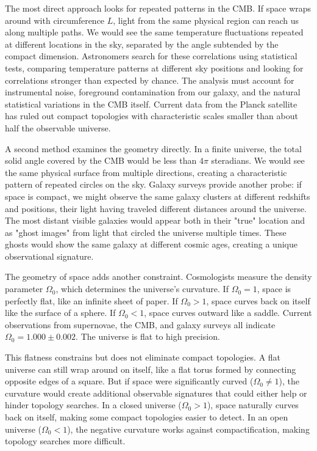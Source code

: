 The most direct approach looks for repeated patterns in the CMB. If space wraps around with circumference $L$, light from the same physical region can reach us along multiple paths. We would see the same temperature fluctuations repeated at different locations in the sky, separated by the angle subtended by the compact dimension. Astronomers search for these correlations using statistical tests, comparing temperature patterns at different sky positions and looking for correlations stronger than expected by chance. The analysis must account for instrumental noise, foreground contamination from our galaxy, and the natural statistical variations in the CMB itself. Current data from the Planck satellite has ruled out compact topologies with characteristic scales smaller than about half the observable universe.

A second method examines the geometry directly. In a finite universe, the total solid angle covered by the CMB would be less than $4\pi$ steradians. We would see the same physical surface from multiple directions, creating a characteristic pattern of repeated circles on the sky. Galaxy surveys provide another probe: if space is compact, we might observe the same galaxy clusters at different redshifts and positions, their light having traveled different distances around the universe. The most distant visible galaxies would appear both in their "true" location and as "ghost images" from light that circled the universe multiple times. These ghosts would show the same galaxy at different cosmic ages, creating a unique observational signature.

The geometry of space adds another constraint. Cosmologists measure the density parameter $\Omega_0$, which determines the universe's curvature. If $\Omega_0 = 1$, space is perfectly flat, like an infinite sheet of paper. If $\Omega_0 > 1$, space curves back on itself like the surface of a sphere. If $\Omega_0 < 1$, space curves outward like a saddle. Current observations from supernovae, the CMB, and galaxy surveys all indicate $\Omega_0 = 1.000 \pm 0.002$. The universe is flat to high precision.

This flatness constrains but does not eliminate compact topologies. A flat universe can still wrap around on itself, like a flat torus formed by connecting opposite edges of a square. But if space were significantly curved ($\Omega_0 \neq 1$), the curvature would create additional observable signatures that could either help or hinder topology searches. In a closed universe ($\Omega_0 > 1$), space naturally curves back on itself, making some compact topologies easier to detect. In an open universe ($\Omega_0 < 1$), the negative curvature works against compactification, making topology searches more difficult.


